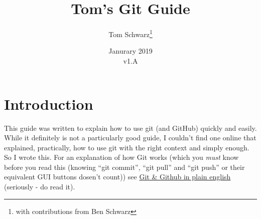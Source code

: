 \documentclass[11pt, titlepage]{article}
\title{Tom's Git Guide}
\author{Tom Schwarz\thanks{with contributions from Ben Schwarz}}
\date{Janurary 2019\\v1.A} %
\begin{document}
\maketitle

\tableofcontents

\section{Introduction}
This guide was written to explain how to use git (and GitHub) quickly and easily. While it definitely is not a particularly good guide, I couldn't find one online that explained, practically, how to use git with the right context and simply enough. So I wrote this. For an explanation of how Git works (which you \emph{must} know before you read this (knowing ``git commit'', ``git pull'' and ``git push'' or their equivalent GUI buttons dosen't count)) see \href{https://blog.red-badger.com/2016/11/29/gitgithub-in-plain-english}{Git \& Github in plain english} (seriously - do read it).

\pagebreak
\end{document}
